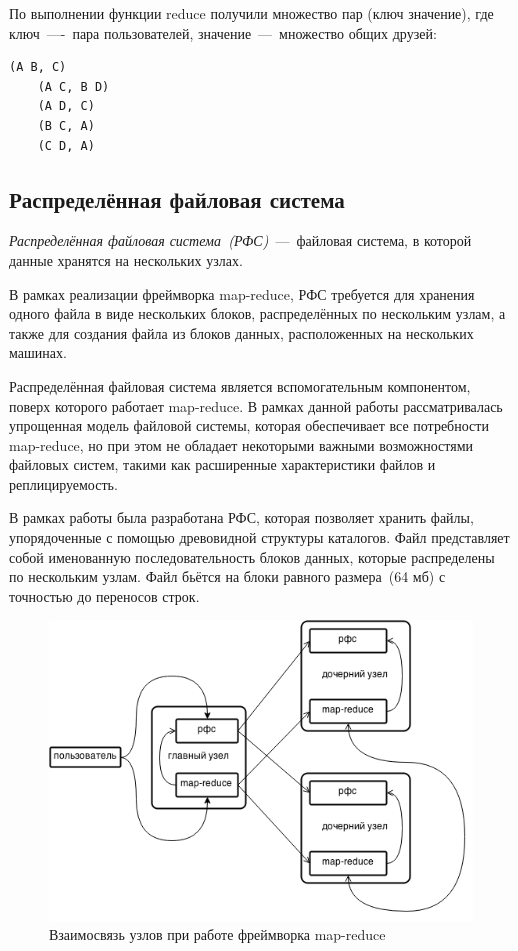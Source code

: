 \documentclass[12pt,a4paper,oneside]{extarticle}
\begin{document}
        По выполнении функции reduce получили множество пар (ключ значение), где ключ~----~пара пользователей, значение~---~множество общих друзей:

            \lstset{}
            \begin{lstlisting}[mathescape] 
    (A B, C)
    (A C, B D)
    (A D, C)
    (B C, A)
    (C D, A)
            \end{lstlisting}

    \clearpage

    \subsection{Распределённая файловая система}
        {\it Распределённая файловая система~(РФС)}~---~файловая система, в которой данные хранятся на нескольких узлах. 

        В рамках реализации фреймворка map-reduce, РФС требуется для хранения одного файла в виде нескольких блоков, распределённых по нескольким узлам, а также для создания файла из блоков данных, расположенных на нескольких машинах.

        Распределённая файловая система является вспомогательным компонентом, поверх которого работает map-reduce. В рамках данной работы рассматривалась упрощенная модель файловой системы, которая обеспечивает все потребности map-reduce, но при этом не обладает некоторыми важными возможностями файловых систем, такими как расширенные характеристики файлов и реплицируемость.

        В рамках работы была разработана РФС, которая позволяет хранить файлы, упорядоченные с помощью древовидной структуры каталогов. Файл представляет собой именованную последовательность блоков данных, которые распределены по нескольким узлам. Файл бьётся на блоки равного размера~(64 мб) с точностью до переносов строк.

        \begin{figure}[h!]
            \centering
            \includegraphics[scale=0.75]{framework_total.png}
            \caption{Взаимосвязь узлов при работе фреймворка map-reduce}
            \label{pic:framework}
        \end{figure}
        
\end{document}

